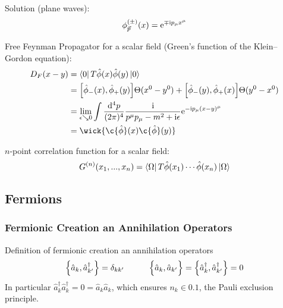 			\noindent
			Solution (plane waves):
			\begin{equation}
				{\phi}^{ ( \pm ) }_{\vec{p}} (x) = \ex^{\mp \i p_\mu x^\mu}
			\end{equation}

			\noindent
			Free Feynman Propagator for a scalar field (\ie Green's function of the Klein--Gordon equation):
			\begin{equation}
				\begin{aligned}
					D_F (x-y)
					&= \Bra{0} T \hat{\phi}(x)\hat{\phi}(y) \Ket{0} \\
					&= \comm{\hat{\phi}_{-}(x)}{\hat{\phi}_{+}(y)} \Theta(x^0-y^0) + \comm{\hat{\phi}_{-}(y)}{\hat{\phi}_{+}(x)} \Theta(y^0-x^0) \\
					&= \lim_{\epsilon \searrow 0} \int \frac{\dd^4 p}{(2\pi)^4} \frac{\i}{p^\mu p_\mu - m^2 + \i \epsilon} \ex^{-\i p_\mu (x-y)^\mu} \\
					&= \wick{\c{\hat{\phi}}(x) \c{\hat{\phi}}(y)} \\
				\end{aligned}
			\end{equation}

			\noindent
			$n$-point correlation function for a scalar field:
			\begin{equation}
				G^{(n)}(x_1, ..., x_n) = \Bra{\Omega} T \hat{\phi}(x_1) \dotsb \hat{\phi}(x_n) \Ket{\Omega}
			\end{equation}

	\subsection{Fermions}
		\subsubsection{Fermionic Creation an Annihilation Operators}
			\label{Sec:FermionicCreationAndAnnihilationOperators}
			Definition of fermionic creation an annihilation operators
			\begin{equation}
				\acomm{\hat{a}_k}{\hat{a}_{k'}^\dagger} = \delta_{kk'}
				\hsp
				\Big\lbrace\hat{a}_k,\hat{a}_{k'}\Big\rbrace = \acomm{\hat{a}_k^\dagger}{\hat{a}_{k'}^\dagger} = 0
			\end{equation}
			In particular $\hat{a}_k^\dagger \hat{a}_k^\dagger = 0 = \hat{a}_k \hat{a}_k$, which ensures $n_k\in\qty{0,1}$, \ie the Pauli exclusion principle.

